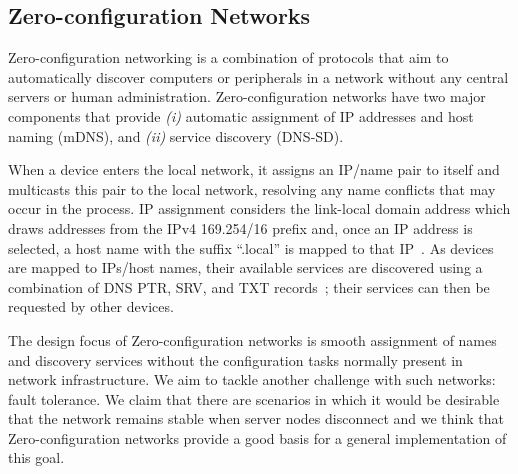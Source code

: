 \subsection{Zero-configuration Networks}
\label{sec:zeroconf}

Zero-configuration networking is a combination of protocols that aim to automatically discover computers or peripherals in a network without any central servers or human administration. Zero-configuration networks have two major components that provide {\it (i)} automatic assignment of IP addresses and host naming (mDNS), and {\it (ii)} service discovery (DNS-SD).

When a device enters the local network, it assigns an IP/name pair to itself and  multicasts this pair to the local network, resolving any name conflicts that may occur in the process. IP assignment considers the link-local domain address which draws addresses from the IPv4 169.254/16 prefix and, once an IP address is selected, a host name with the suffix ``.local'' is mapped to that IP~\cite{rfc6762}. As devices are mapped to IPs/host names, their available services are discovered using a combination of DNS PTR, SRV, and TXT records~\cite{rfc6763}; their services can then be requested by other devices.

The design focus of Zero-configuration networks is smooth assignment of names and discovery services without the configuration tasks normally present in network infrastructure. We aim to tackle another challenge with such networks: fault tolerance. We claim that there are scenarios in which it would be desirable that the network remains stable when server nodes disconnect and we think that Zero-configuration networks provide a good basis for a general implementation of this goal.